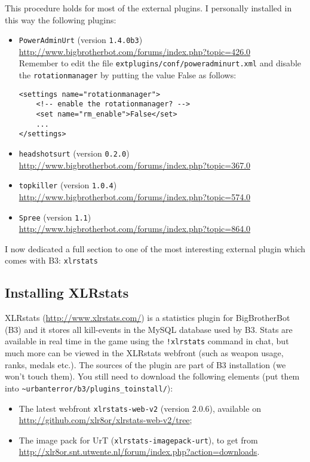 \noindent This procedure holds for most of the external plugins. 
I personally installed in this way the following plugins: 
\begin{itemize}\setitemsep
\item \texttt{PowerAdminUrt} (version \texttt{1.4.0b3})\\
  {\small \url{http://www.bigbrotherbot.com/forums/index.php?topic=426.0}}\\
  Remember to edit the file \texttt{extplugins/conf/poweradminurt.xml} and
  disable the \texttt{rotationmanager} by putting the value False as follows:
  \begin{lstlisting}[style=apachecfg]
<settings name="rotationmanager">
    <!-- enable the rotationmanager? -->
    <set name="rm_enable">False</set>
    ...
</settings> 
 \end{lstlisting}
\item \texttt{headshotsurt} (version \texttt{0.2.0}) \\ 
  {\small \url{http://www.bigbrotherbot.com/forums/index.php?topic=367.0}}
\item \texttt{topkiller} (version \texttt{1.0.4})\\
  {\small\url{http://www.bigbrotherbot.com/forums/index.php?topic=574.0}}
\item \texttt{Spree} (version \texttt{1.1})\\
  {\small\url{http://www.bigbrotherbot.com/forums/index.php?topic=864.0}}
\end{itemize}

I now dedicated a full section to one of the most interesting external plugin
which comes with B3: \texttt{xlrstats}

\subsection{Installing XLRstats}
\label{sec:b3:xlrstats}

XLRstats (\url{http://www.xlrstats.com/}) is a statistics plugin for
BigBrotherBot (B3) and it stores all kill-events in the MySQL database used by
B3.
Stats are available in real time in the game using the \texttt{!xlrstats} command in
chat, but much more can be viewed in the XLRstats webfront (such as weapon
usage, ranks, medals etc.).
The sources of the plugin are part of B3 installation (we won't touch them). 
You still need to download the following elements (put them
into \verb!~urbanterror/b3/plugins_toinstall/!):
\begin{itemize}\setitemsep
\item The latest webfront \texttt{xlrstats-web-v2} (version 2.0.6), available on\\
 \url{http://github.com/xlr8or/xlrstats-web-v2/tree};
\item The image pack for UrT (\texttt{xlrstats-imagepack-urt}), to get from\\
  \url{http://xlr8or.snt.utwente.nl/forum/index.php?action=downloads}. 
\end{itemize}

